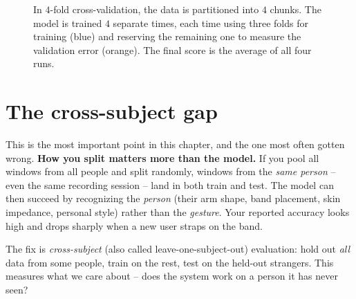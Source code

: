 \begin{figure}[H]
\centering
{}
\caption{In $4$-fold cross-validation, the data is partitioned into $4$ chunks. The model is trained $4$ separate times, each time using three folds for training (blue) and reserving the remaining one to measure the validation error (orange). The final score is the average of all four runs.}
\label{ch39:fig-cv}
\end{figure}


\section{The cross-subject gap}
\label{ch39:cross-subject}

This is the most important point in this chapter, and the one most
often gotten wrong. \textbf{How you split matters more than the model.} If you pool all
windows from all people and split randomly, windows from the \emph{same person} -- even
the same recording session -- land in both train and test. The model can then succeed by
recognizing the \emph{person} (their arm shape, band placement, skin impedance, personal
style) rather than the \emph{gesture}. Your reported accuracy looks high and drops sharply
when a new user straps on the band.

The fix is \emph{cross-subject} (also called leave-one-subject-out) evaluation: hold out
\emph{all} data from some people, train on the rest, test on the held-out strangers.
This measures what we care about -- does the system work on a person it has
never seen?

